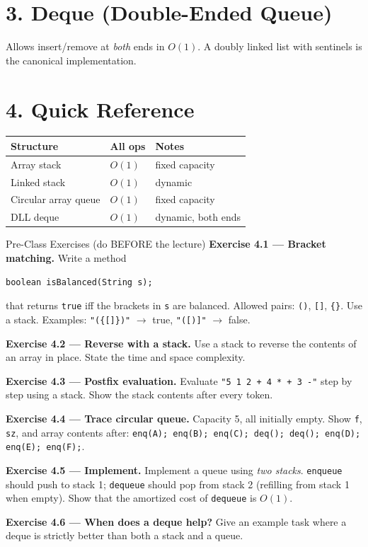 \documentclass[11pt]{article}
\begin{document}
\section*{3. Deque (Double-Ended Queue)}

Allows insert/remove at \emph{both} ends in $O(1)$. A doubly linked list with sentinels is the canonical implementation.

\section*{4. Quick Reference}

\begin{center}
\begin{tabular}{lll}
\textbf{Structure} & \textbf{All ops} & \textbf{Notes} \\
\hline
Array stack         & $O(1)$ & fixed capacity \\
Linked stack        & $O(1)$ & dynamic \\
Circular array queue& $O(1)$ & fixed capacity \\
DLL deque           & $O(1)$ & dynamic, both ends \\
\end{tabular}
\end{center}

\begin{exbox}{Pre-Class Exercises (do BEFORE the lecture)}
\textbf{Exercise 4.1 --- Bracket matching.} Write a method
\begin{lstlisting}
boolean isBalanced(String s);
\end{lstlisting}
that returns \texttt{true} iff the brackets in \texttt{s} are balanced. Allowed pairs: \verb|()|, \verb|[]|, \verb|{}|. Use a stack. Examples: \verb|"({[]})"| $\to$ true, \verb|"([)]"| $\to$ false.

\textbf{Exercise 4.2 --- Reverse with a stack.} Use a stack to reverse the contents of an array in place. State the time and space complexity.

\textbf{Exercise 4.3 --- Postfix evaluation.} Evaluate \verb|"5 1 2 + 4 * + 3 -"| step by step using a stack. Show the stack contents after every token.

\textbf{Exercise 4.4 --- Trace circular queue.} Capacity 5, all initially empty. Show \texttt{f}, \texttt{sz}, and array contents after:
\verb|enq(A); enq(B); enq(C); deq(); deq(); enq(D); enq(E); enq(F);|.

\textbf{Exercise 4.5 --- Implement.} Implement a queue using \emph{two stacks}. \texttt{enqueue} should push to stack 1; \texttt{dequeue} should pop from stack 2 (refilling from stack 1 when empty). Show that the amortized cost of \texttt{dequeue} is $O(1)$.

\textbf{Exercise 4.6 --- When does a deque help?} Give an example task where a deque is strictly better than both a stack and a queue.
\end{exbox}
\end{document}
